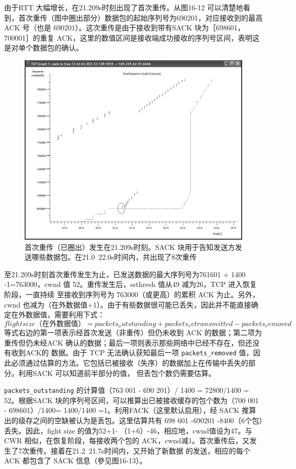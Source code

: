 由于RTT 大幅增长，在21.209s时刻出现了首次重传。从图16-12 可以清楚地看到，首次重传（图中圈出部分）数据包的起始序列号为690201，对应接收到的最高 ACK 号（也是
690201）。这次重传是由于接收到带有SACK 块为［698601，700001］的重复 ACK，这里的数值区间是接收端成功接收的序列号区间，表明这是对单个数据包的确认。
\begin{figure}[!htb]
    \centering
	\includegraphics[width=1\textwidth]{imgs/16/16-12.png}
	\caption{首次重传（已圈出）发生在21.209s时刻。SACK 块用于告知发送方发送哪些数据包。在21.0~22.0s时间内，共出现了8次重传}
\end{figure}

至21.209s时刻首次重传发生为止，已发送数据的最大序列号为761601 + 1400 -1=763000，cwnd 值 52。重传发生后，ssthresh 值从49 减为26，TCP 进入恢复阶段，一直持续
至接收到序列号为 763000（或更高）的累积 ACK 为止。另外，cwnd 也减为（在外数据值+1）。由于有些数据很可能已丢失，因此并不能直接确定在外数据值，需要利用下式：
\begin{equation}
    flight size（在外数据值）=packets_outstanding + packets_retransmitted - packets_removed
\end{equation}
等式右边的第一项表示经首次发送（非重传）但仍未收到 ACK 的数据；第二项为重传但仍未经ACK 确认的数据；最后一项则表示那些网络中已经不存在，但还没有收到ACK的
数据。由于 TCP 无法确认获知最后一项 \verb|packets_removed| 值，因此必须通过估算的方法。它包括已被接收（失序）的数据加上在传输中丢失的部分。利用SACK 可以知道前半部分的值，
但丢包个数仍需要估算。

\verb|packets_outstanding| 的计算值（763 001 - 690 201）/ 1400 = 72800/1400 = 52。根据SACK 块的序列号区间，可以推算出已被接收缓存的包个数为（700 001 - 698601）/1400=
1400/1400 =1。利用FACK（这里默认启用），经 SACK 推算出的级存之间的空缺被认为是丢包。这里估算共有 698 601 -690201 -8400（6个包）丢失。因此，fight size 的值为52+1-
（1+6）-46，相应地，cwnd值设为47。与CWR 相似，在恢复阶段，每接收两个包的 ACK，cwnd减1。首次重传后，又发生了7次重传。接着在21.2~21.7s时间内，又开始了新数据
的发送，相应的每个 ACK 都包含了 SACK 信息（參见图16-13）。

